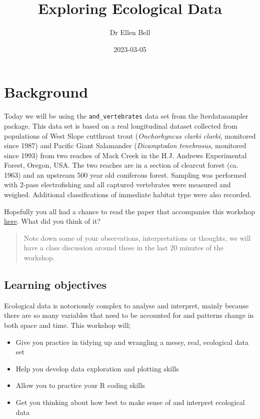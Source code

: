 \documentclass[
]{book}
\title{Exploring Ecological Data}
\author{Dr Ellen Bell}
\date{2023-03-05}
\providecommand{\tightlist}{%
  \setlength{\itemsep}{0pt}\setlength{\parskip}{0pt}}
\begin{document}
\maketitle

{
\setcounter{tocdepth}{1}
\tableofcontents
}
\hypertarget{background}{%
\chapter{Background}\label{background}}

Today we will be using the \texttt{and\_vertebrates} data set from the lterdatasampler package. This data set is based on a real longitudinal dataset collected from populations of West Slope cutthroat trout (\emph{Onchorhyncus clarki clarki}, monitored since 1987) and Pacific Giant Salamander (\emph{Dicamptodon tenebrosus}, monitored since 1993) from two reaches of Mack Creek in the H.J. Andrews Experimental Forest, Oregon, USA. The two reaches are in a section of clearcut forest (ca. 1963) and an upstream 500 year old coniferous forest. Sampling was performed with 2-pass electrofishing and all captured vertebrates were measured and weighed. Additional classifications of immediate habitat type were also recorded.

Hopefully you all had a chance to read the paper that accompanies this workshop \href{https://esajournals.onlinelibrary.wiley.com/doi/full/10.1002/ecs2.1845}{here}. What did you think of it?

\begin{quote}
Note down some of your observations, interpretations or thoughts, we will have a class discussion around these in the last 20 minutes of the workshop.
\end{quote}

\hypertarget{learning-objectives}{%
\section{Learning objectives}\label{learning-objectives}}

Ecological data is notoriously complex to analyse and interpret, mainly because there are so many variables that need to be accounted for and patterns change in both space and time. This workshop will;

\begin{itemize}
\tightlist
\item
  Give you practice in tidying up and wrangling a messy, real, ecological data set
\item
  Help you develop data exploration and plotting skills
\item
  Allow you to practice your R coding skills
\item
  Get you thinking about how best to make sense of and interpret ecological data
\end{itemize}
\end{document}
